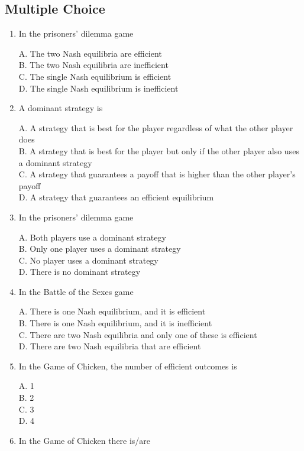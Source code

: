 \documentclass[
]{book}
\begin{document}
\hypertarget{multiple-choice-8}{%
\subsection{Multiple Choice}\label{multiple-choice-8}}

\begin{enumerate}
\def\labelenumi{\arabic{enumi}.}
\item
  In the prisoners' dilemma game

  A. The two Nash equilibria are efficient\\
  B. The two Nash equilibria are inefficient\\
  C. The single Nash equilibrium is efficient\\
  D. The single Nash equilibrium is inefficient
\item
  A dominant strategy is

  A. A strategy that is best for the player regardless of what the other player does\\
  B. A strategy that is best for the player but only if the other player also uses a dominant strategy\\
  C. A strategy that guarantees a payoff that is higher than the other player's payoff\\
  D. A strategy that guarantees an efficient equilibrium
\item
  In the prisoners' dilemma game

  A. Both players use a dominant strategy\\
  B. Only one player uses a dominant strategy\\
  C. No player uses a dominant strategy\\
  D. There is no dominant strategy
\item
  In the Battle of the Sexes game

  A. There is one Nash equilibrium, and it is efficient\\
  B. There is one Nash equilibrium, and it is inefficient\\
  C. There are two Nash equilibria and only one of these is efficient\\
  D. There are two Nash equilibria that are efficient
\item
  In the Game of Chicken, the number of efficient outcomes is

  A. 1\\
  B. 2\\
  C. 3\\
  D. 4
\item
  In the Game of Chicken there is/are


\end{enumerate}
\end{document}
